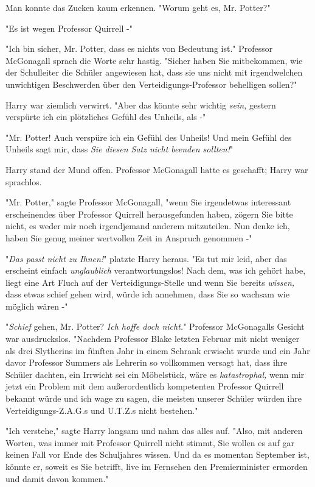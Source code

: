 {Man konnte das Zucken kaum erkennen. "Worum geht es, Mr. Potter?"

"Es ist wegen Professor Quirrell -"

"Ich bin sicher, Mr. Potter, dass es nichts von Bedeutung ist." Professor McGonagall sprach die Worte sehr hastig. "Sicher haben Sie mitbekommen, wie der Schulleiter die Schüler angewiesen hat, dass sie uns nicht mit irgendwelchen unwichtigen Beschwerden über den Verteidigungs-Professor behelligen sollen?"

Harry war ziemlich verwirrt. "Aber das könnte sehr wichtig \emph{sein,} gestern verspürte ich ein plötzliches Gefühl des Unheils, als -"

"Mr. Potter! Auch verspüre ich ein Gefühl des Unheils! Und mein Gefühl des Unheils sagt mir, dass \emph{Sie diesen Satz nicht beenden sollten!}"

Harry stand der Mund offen. Professor McGonagall hatte es geschafft; Harry war sprachlos.

"Mr. Potter," sagte Professor McGonagall, "wenn Sie irgendetwas interessant erscheinendes über Professor Quirrell herausgefunden haben, zögern Sie bitte nicht, es weder mir noch irgendjemand anderem mitzuteilen. Nun denke ich, haben Sie genug meiner wertvollen Zeit in Anspruch genommen -"

"\emph{Das passt nicht zu Ihnen!}" platzte Harry heraus. "Es tut mir leid, aber das erscheint einfach \emph{unglaublich} verantwortungslos! Nach dem, was ich gehört habe, liegt eine Art Fluch auf der Verteidigungs-Stelle und wenn Sie bereits \emph{wissen,} dass etwas schief gehen wird, würde ich annehmen, dass Sie so wachsam wie möglich wären -"

"\emph{Schief} gehen, Mr. Potter? \emph{Ich hoffe doch nicht.}" Professor McGonagalls Gesicht war ausdruckslos. "Nachdem Professor Blake letzten Februar mit nicht weniger als drei Slytherins im fünften Jahr in einem Schrank erwischt wurde und ein Jahr davor Professor Summers als Lehrerin so vollkommen versagt hat, dass ihre Schüler dachten, ein Irrwicht sei ein Möbelstück, wäre es \emph{katastrophal,} wenn mir jetzt ein Problem mit dem außerordentlich kompetenten Professor Quirrell bekannt würde und ich wage zu sagen, die meisten unserer Schüler würden ihre Verteidigungs-Z.A.G.s und U.T.Z.s nicht bestehen."

"Ich verstehe," sagte Harry langsam und nahm das alles auf. "Also, mit anderen Worten, was immer mit Professor Quirrell nicht stimmt, Sie wollen es auf gar keinen Fall vor Ende des Schuljahres wissen. Und da es momentan September ist, könnte er, soweit es Sie betrifft, live im Fernsehen den Premierminister ermorden und damit davon kommen."

}
